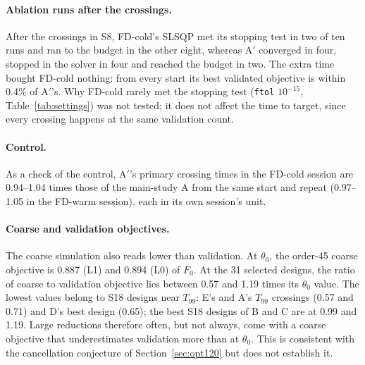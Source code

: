 \documentclass{anvil-paper}
\begin{document}
\paragraph{Ablation runs after the crossings.}
After the crossings in S8, FD-cold's SLSQP met its stopping test in two of ten runs and ran to the
budget in the other eight, whereas A$'$ converged in four, stopped in the
solver in four and reached the budget in two. The extra time bought FD-cold
nothing: from every start its best validated objective is within 0.4\% of
A$'$'s. Why FD-cold rarely met the stopping test (\texttt{ftol} $10^{-15}$,
Table~\ref{tab:settings}) was not tested; it does not affect the time to
target, since every crossing happens at the same validation count.

\paragraph{Control.}
As a check of the control,
A$'$'s primary crossing times in the FD-cold session are 0.94--1.04 times those
of the main-study A from the same start and repeat (0.97--1.05 in the
FD-warm session), each in its own session's unit.

\paragraph{Coarse and validation objectives.}
The coarse simulation also reads lower than validation. At $\theta_0$, the
order-45 coarse objective is 0.887 (L1) and 0.894 (L0) of $F_0$. At the
31 selected designs, the ratio of coarse to validation objective lies
between 0.57 and 1.19 times its $\theta_0$ value. The lowest values belong
to S18 designs near $T_{99}$: E's and A's $T_{99}$ crossings (0.57 and
0.71) and D's best design (0.65); the best S18 designs of B and C are at
0.99 and 1.19. Large reductions therefore often, but not always, come with a
coarse objective that underestimates validation more than at $\theta_0$.
This is consistent with the cancellation conjecture of
Section~\ref{sec:opt120} but does not establish it.
\end{document}
